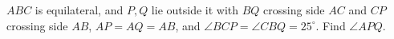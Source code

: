 $ABC$ is equilateral, and $P,Q$ lie outside it with $BQ$ crossing side $AC$ and $CP$ crossing side $AB$, $AP=AQ=AB$, and $\angle BCP=\angle CBQ=25^\circ$. Find $\angle APQ$.
